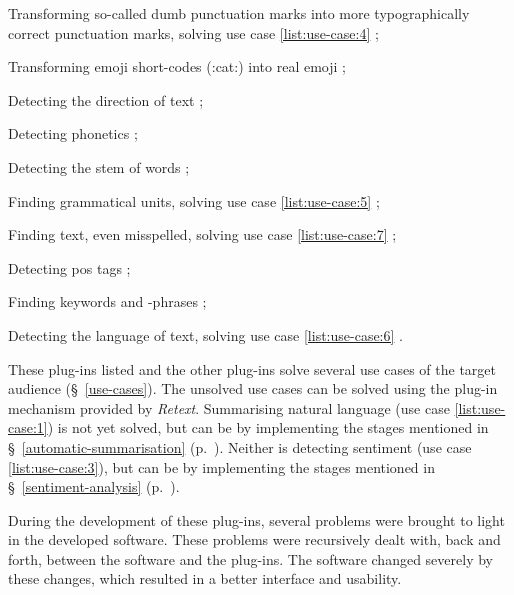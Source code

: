 \begin{aenumerate}
\item Transforming so-called dumb punctuation marks into more
  typographically correct punctuation marks, solving use case
  \ref{list:use-case:4} \autocite*{wooorm/retext-smartypants-source-code};
\item Transforming emoji short-codes (:cat:) into real emoji
  \autocite*{wooorm/retext-emoji-source-code};
\item Detecting the direction of text
  \autocite*{wooorm/retext-directionality-source-code};
\item Detecting phonetics
  \autocite*{wooorm/retext-double-metaphone-source-code};
\item Detecting the stem of words
  \autocite*{wooorm/retext-porter-stemmer-source-code};
\item Finding grammatical units, solving use case
  \ref{list:use-case:5}  \autocite*{wooorm/retext-visit-source-code};
\item Finding text, even misspelled, solving use case
  \ref{list:use-case:7} \autocite*{wooorm/retext-search-source-code};
\item Detecting \gls{pos} tags \autocite*{wooorm/retext-pos-source-code};
\item Finding keywords and -phrases
  \autocite*{wooorm/retext-keywords-source-code};
\item Detecting the language of text, solving use case \ref{list:use-case:6} 
  \autocite*{wooorm/retext-language-source-code}.
\end{aenumerate}

\noindent These plug-ins listed and the other plug-ins solve several use cases
  of the target audience (§~\ref{use-cases}).
The unsolved use cases can be solved using the plug-in mechanism provided by
  \emph{Retext}.
Summarising natural language (use case \ref{list:use-case:1}) is not yet
  solved, but can be by implementing the stages mentioned in
  §~\ref{automatic-summarisation} (p.~\pageref{automatic-summarisation}).
Neither is detecting sentiment (use case \ref{list:use-case:3}), but can be
  by implementing the stages mentioned in §~\ref{sentiment-analysis}
  (p.~\pageref{sentiment-analysis}).

During the development of these plug-ins, several problems were brought to
  light in the developed software.
These problems were recursively dealt with, back and forth, between the
  software and the plug-ins.
The software changed severely by these changes, which resulted in a
  better interface and usability.

